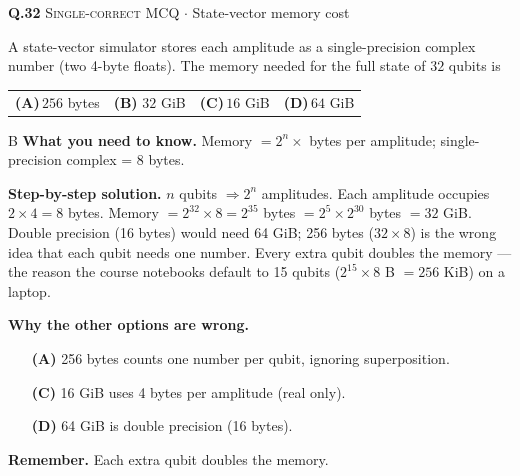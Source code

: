 \documentclass[11pt,a4paper]{article}
\newcommand{\optlabel}[1]{\textbf{(#1)}}
\newcommand{\correctlabel}[1]{\textcolor{okgreen}{\textbf{(#1)}\,\ding{51}}}
\newenvironment{qitem}[1]{\begin{list}{}{\setlength{\leftmargin}{3.3em}\setlength{\labelwidth}{3.1em}%
  \setlength{\labelsep}{0.2em}\setlength{\topsep}{3pt}\setlength{\parsep}{3pt}}\item[\textbf{Q.#1}\hfill]}{\end{list}}
\newcommand{\qsep}{\par\vspace{2pt}{\color{black!15}\hrule}\vspace{4pt}}
\newcommand{\qmeta}[2]{{\footnotesize\color{black!60}\textsc{#1} \;$\cdot$\; #2}\par}
\begin{document}
\begin{qitem}{32}
\qmeta{Single-correct MCQ}{State-vector memory cost}
A state-vector simulator stores each amplitude as a single-precision complex number (two 4-byte floats).
The memory needed for the full state of $32$ qubits is
\par\smallskip\noindent\begin{tabularx}{\linewidth}{@{}*{4}{L}@{}}
\optlabel{A}\,$256$ bytes & \correctlabel{B}\,$32$ GiB & \optlabel{C}\,$16$ GiB & \optlabel{D}\,$64$ GiB
\end{tabularx}
\end{qitem}
\begin{solbox}{B}
\textbf{\color{brand}What you need to know.} Memory $= 2^n\times$ bytes per amplitude; single-precision complex = 8 bytes.

\textbf{\color{brand}Step-by-step solution.} $n$ qubits $\Rightarrow 2^n$ amplitudes. Each amplitude occupies $2 \times 4 = 8$ bytes. Memory $= 2^{32}\times 8 = 2^{35}$ bytes
$= 2^{5}\times 2^{30}$ bytes $= 32$ GiB. Double precision (16 bytes) would need 64 GiB; 256 bytes ($32\times8$) is the
wrong idea that each qubit needs one number. Every extra qubit doubles the memory --- the reason the course notebooks
default to 15 qubits ($2^{15}\times 8$ B $= 256$ KiB) on a laptop.

\textbf{\color{brand}Why the other options are wrong.}
\begin{itemize}[leftmargin=2.4em, itemsep=1pt, topsep=2pt]
\item[\textbf{(A)}] 256 bytes counts one number per qubit, ignoring superposition.
\item[\textbf{(C)}] 16 GiB uses 4 bytes per amplitude (real only).
\item[\textbf{(D)}] 64 GiB is double precision (16 bytes).
\end{itemize}
\textbf{\color{brand}Remember.} Each extra qubit doubles the memory.
\end{solbox}
\qsep
\end{document}
